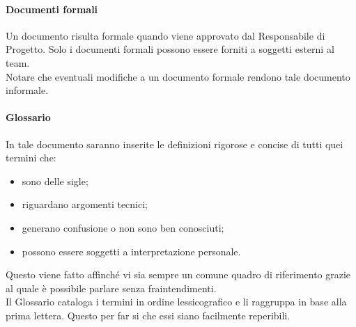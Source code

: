 			\paragraph{Documenti formali}
				Un documento risulta formale quando viene approvato dal Responsabile di Progetto. Solo i documenti formali possono essere forniti a soggetti esterni al team.\\
				Notare che eventuali modifiche a un documento formale rendono tale documento informale.
			\paragraph{Glossario}
				In tale documento saranno inserite le definizioni rigorose e concise di tutti quei termini che:
				\begin{itemize}
					\item sono delle sigle;
					\item riguardano argomenti tecnici;
					\item generano confusione o non sono ben conosciuti;
					\item possono essere soggetti a interpretazione personale.
				\end{itemize}
				Questo viene fatto affinché vi sia sempre un comune quadro di riferimento grazie al quale è possibile parlare senza fraintendimenti.\\
				Il Glossario cataloga i termini in ordine lessicografico e li raggruppa in base alla prima lettera. Questo per far si che essi siano facilmente reperibili.
